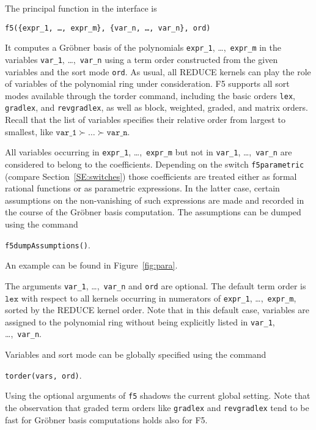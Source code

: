 \documentclass{article}
\newcommand{\grobner}{Gr\"obner}
\newcommand{\code}[1]{\texttt{#1}}
\begin{document}
The principal function in the interface is
%
\begin{center}
    \code{f5(\{expr\_1, \ldots, expr\_m\}, \{var\_n, \ldots, var\_n\}, ord)}
\end{center}
%
It computes a \grobner{} basis of the polynomials \code {expr\_1}, \dots,~\code{expr\_m} in the variables \code{var\_1}, \dots,~\code{var\_n} using a
term order constructed from the given variables and the sort mode \code{ord}. As usual, all REDUCE
kernels can play the role of variables of the polynomial ring under consideration. F5 supports all sort modes
available through the torder command, including the basic orders \code{lex}, 
\code{gradlex}, and \code{revgradlex}, as well as block, weighted, graded, and matrix orders. 
Recall that the list of variables
specifies their relative order from largest to smallest, like $\code{var\_1} \succ \dots \succ
\code{var\_n}$.

All variables occurring in \code{expr\_1}, \dots,~\code{expr\_m} but not in \code{var\_1},
\dots,~\code{var\_n} are considered to belong to the coefficients. Depending on the switch
\code{f5para\-met\-ric} (compare Section~\ref{SE:switches}) those coefficients are treated either as
formal rational functions or as parametric expressions. In the latter case, certain assumptions on
the non-vanishing of such expressions are made and recorded in the course of the \grobner{} basis
computation. The assumptions can be dumped using the command
%
\begin{center}
\code{f5dumpAssumptions()}.
\end{center}
An example can be found in Figure~\ref{fig:para}.

The arguments \code{var\_1}, \dots,~\code{var\_n} and \code{ord} are optional. The default term
order is $\code{lex}$ with respect to all kernels occurring in numerators of \code{expr\_1},
\dots,~\code{expr\_m}, sorted by the REDUCE kernel order. Note that in this default case, variables
are assigned to the polynomial ring without being explicitly listed in \code{var\_1},
\dots,~\code{var\_n}.

Variables and sort mode can be globally specified using the command
%
\begin{center}
    \code{torder(vars, ord)}.
\end{center}
%
Using the optional arguments of \code{f5} shadows the current global
setting. Note that the observation that graded term orders like
\code{gradlex} and \code{revgradlex} tend to be fast for \grobner{}
basis computations \cite[\S5]{tolstaya} holds also for F5.
\end{document}
